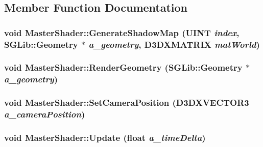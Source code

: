 \subsection{Member Function Documentation}
\hypertarget{class_master_shader_ad80b7842501424ac272a1511e77bf56a}{
\subsubsection[{GenerateShadowMap}]{\setlength{\rightskip}{0pt plus 5cm}void MasterShader::GenerateShadowMap (UINT {\em index}, \/  SGLib::Geometry $\ast$ {\em a\_\-geometry}, \/  D3DXMATRIX {\em matWorld})}}
\label{class_master_shader_ad80b7842501424ac272a1511e77bf56a}
\hypertarget{class_master_shader_a5fc7f7834ff6938c2b55d6af5c97766d}{
\subsubsection[{RenderGeometry}]{\setlength{\rightskip}{0pt plus 5cm}void MasterShader::RenderGeometry (SGLib::Geometry $\ast$ {\em a\_\-geometry})}}
\label{class_master_shader_a5fc7f7834ff6938c2b55d6af5c97766d}
\hypertarget{class_master_shader_af1125d20e6425a5694700a08ae061d3e}{
\subsubsection[{SetCameraPosition}]{\setlength{\rightskip}{0pt plus 5cm}void MasterShader::SetCameraPosition (D3DXVECTOR3 {\em a\_\-cameraPosition})}}
\label{class_master_shader_af1125d20e6425a5694700a08ae061d3e}
\hypertarget{class_master_shader_acf8849db1f0ac43c2d35bf714ef285ed}{
\subsubsection[{Update}]{\setlength{\rightskip}{0pt plus 5cm}void MasterShader::Update (float {\em a\_\-timeDelta})}}
\label{class_master_shader_acf8849db1f0ac43c2d35bf714ef285ed}


